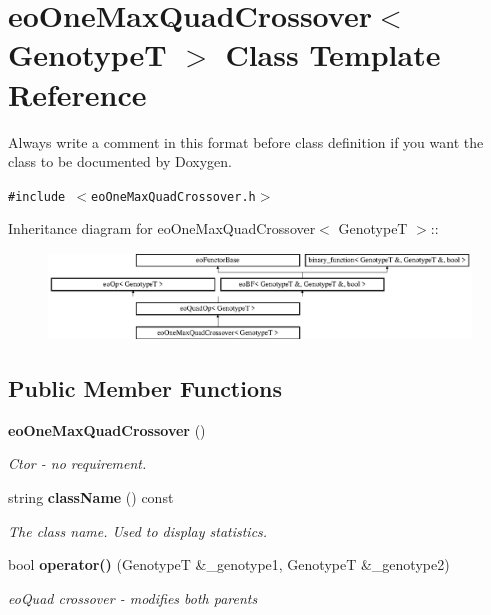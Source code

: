 \section{eo\-One\-Max\-Quad\-Crossover$<$ Genotype\-T $>$ Class Template Reference}
\label{classeo_one_max_quad_crossover}
Always write a comment in this format before class definition if you want the class to be documented by Doxygen.  


{\tt \#include $<$eo\-One\-Max\-Quad\-Crossover.h$>$}

Inheritance diagram for eo\-One\-Max\-Quad\-Crossover$<$ Genotype\-T $>$::\begin{figure}[H]
\begin{center}
\leavevmode
\includegraphics[height=2.30453cm]{classeo_one_max_quad_crossover}
\end{center}
\end{figure}
\subsection*{Public Member Functions}
\begin{CompactItemize}
\item 
{\bf eo\-One\-Max\-Quad\-Crossover} ()\label{classeo_one_max_quad_crossover_a0}

\begin{CompactList}\small\item\em Ctor - no requirement. \item\end{CompactList}\item 
string {\bf class\-Name} () const \label{classeo_one_max_quad_crossover_a1}

\begin{CompactList}\small\item\em The class name. Used to display statistics. \item\end{CompactList}\item 
bool {\bf operator()} (Genotype\-T \&\_\-genotype1, Genotype\-T \&\_\-genotype2)
\begin{CompactList}\small\item\em eo\-Quad crossover - modifies both parents \item\end{CompactList}\end{CompactItemize}


